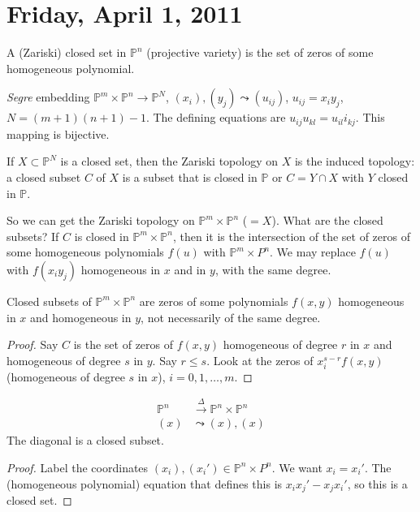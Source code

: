 \documentclass [letterpaper,11pt,twoside]{article}
\begin{document}
\setcounter {section}{21}\section {Friday, April 1, 2011}
  A (Zariski) closed set in $\mathbb P^n$ (projective variety) is the set of zeros of some homogeneous polynomial.

  \emph{Segre} embedding $\mathbb P^m \times \mathbb P^n \to \mathbb P^N$, $(x_i),(y_j)\leadsto (u_{ij})$, $u_{ij} = x_iy_j$, $N = (m+1)(n+1) - 1$.  The defining equations are $u_{ij}u_{kl} = u_{il}i_{kj}$.  This mapping is bijective.

  If $X\subset \mathbb P^N$ is a closed set, then the Zariski topology on $X$ is the induced topology: a closed subset $C$ of $X$ is a subset that is closed in $\mathbb P$ or $C = Y \cap X$ with $Y$ closed in $\mathbb P$.

  So we can get the Zariski topology on $\mathbb P^m \times \mathbb P^n$ ($=X$).  What are the closed subsets?  If $C$ is closed in $\mathbb P^m\times \mathbb P^n$, then it is the intersection of the set of zeros of some homogeneous polynomials $f(u)$ with $\mathbb P^m \times P^n$.  We may replace $f(u)$ with $f(x_iy_j)$ homogeneous in $x$ and in $y$, with the same degree.

  \begin{prop*}
    Closed subsets of $\mathbb P^m \times \mathbb P^n$ are zeros of some polynomials $f(x, y)$ homogeneous in $x$ and homogeneous in $y$, not necessarily of the same degree.
  \end{prop*}
  \begin{proof}
    Say $C$ is the set of zeros of $f(x, y)$ homogeneous of degree $r$ in $x$ and homogeneous of degree $s$ in $y$.  Say $r\le s$.  Look at the zeros of $x_i^{s-r}f(x, y)$ (homogeneous of degree $s$ in $x$), $i = 0, 1, \ldots, m$.
  \end{proof}

  \begin{cor*}
    \begin{align*}
      \mathbb P^n & \stackrel{\Delta}{\to} \mathbb P^n \times \mathbb P^n \\
      (x) & \leadsto (x), (x)
    \end{align*}
    The diagonal is a closed subset.
  \end{cor*}
  \begin{proof}
    Label the coordinates $(x_i), (x_i')\in \mathbb P^n \times P^n$.  We want $x_i = x_i'$.  The (homogeneous polynomial) equation that defines this is $x_i x_j' - x_j x_i'$, so this is a closed set.
  \end{proof}
\end{document}
